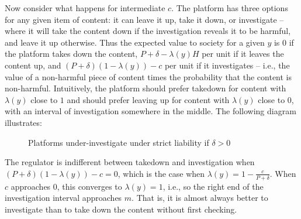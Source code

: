 Now consider what happens for intermediate $c$. The platform has three options for any given item of content: it can leave it up, take it down, or investigate -- where it will take the content down if the investigation reveals it to be harmful, and leave it up otherwise. Thus the expected value to society for a given $y$ is $0$ if the platform takes down the content, $P + \delta - \lambda(y)H$ per unit if it leaves the content up, and $(P + \delta)(1 - \lambda(y)) - c$ per unit if it investigates -- i.e., the value of a non-harmful piece of content times the probability that the content is non-harmful. Intuitively, the platform should prefer takedown for content with $\lambda(y)$ close to $1$ and should prefer leaving up for content with $\lambda(y)$ close to $0$, with an interval of investigation somewhere in the middle. The following diagram illustrates:

\begin{figure}[h]
    \centering
{}
    \caption{Platforms under-investigate under strict liability if $\delta>0$}
    \label{fig:investigation}
\end{figure}

The regulator is indifferent between takedown and investigation when $(P + \delta)(1 - \lambda(y)) - c = 0$, which is the case when $\lambda(y) = 1 - \frac{c}{P + \delta}$. When $c$ approaches $0$, this converges to $\lambda(y) = 1$, i.e., so the right end of the investigation interval approaches $m$. That is, it is almost always better to investigate than to take down the content without first checking. 

